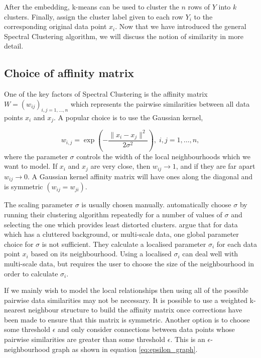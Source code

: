 After the embedding, k-means can be used to cluster the $n$ rows of $Y$ into $k$ clusters. Finally, assign the cluster label given to each row $Y_i$ to the corresponding original data point $x_i$. Now that we have introduced the general Spectral Clustering algorithm, we will discuss the notion of similarity in more detail.

\subsection{Choice of affinity matrix}
\label{sec:affinity}

One of the key factors of Spectral Clustering is the affinity matrix $W = (w_{ij})_{ i,j = 1, \ldots, n}$  which represents the pairwise similarities between all data points $x_i$ and $x_j$. A popular choice is to use the Gaussian kernel, 

\begin{equation}
  \label{eq:gaussian_affinity}
    w_{i,j} = \exp  \left( - \frac{\| x_i - x_j \|^2}{2 \sigma^2} \right), \; i, j = 1, \ldots, n,
\end{equation}
where the parameter $\sigma$ controls the width of the local neighbourhoods which we want to model. If $x_i$ and $x_j$ are very close, then $w_{ij} \rightarrow 1 $, and if they are far apart $w_{ij} \rightarrow 0$. A Gaussian kernel affinity matrix will have ones along the diagonal and is symmetric $(w_{ij} = w_{ji})$.

The scaling parameter $\sigma$ is usually chosen manually. \cite{Ng2001} automatically choose $\sigma$ by running their clustering algorithm repeatedly for a number of values of $\sigma$ and selecting the one which provides least distorted clusters. \cite{Zelnik-Manor2004} argue that for data which has a cluttered background, or multi-scale data, one global parameter choice for $\sigma$ is not sufficient. They calculate a localised parameter $\sigma_i$ for each data point $x_i$ based on its neighbourhood. Using a localised $\sigma_i$ can deal well with multi-scale data, but requires the user to choose the size of the neighbourhood in order to calculate $\sigma_i$. 

If we mainly wish to model the local relationships then using all of the possible pairwise data similarities may not be necessary. It is possible to use a weighted k-nearest neighbour structure \citep{Luxburg2008} to build the affinity matrix once corrections have been made to ensure that this matrix is symmetric. Another option is to choose some threshold $\epsilon$ and only consider connections between data points whose pairwise similarities are greater  than some threshold $\epsilon$. This is an $\epsilon$-neighbourhood graph as shown in equation \eqref{eq:epsilon_graph}. 


